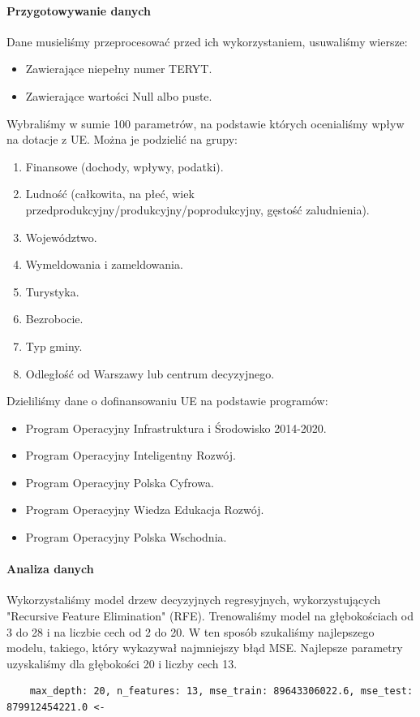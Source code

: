 \documentclass[12pt]{article}
\begin{document}
\paragraph{Przygotowywanie danych}
Dane musieliśmy przeprocesować przed ich wykorzystaniem, usuwaliśmy wiersze:
\begin{itemize}
    \item Zawierające niepełny numer TERYT.
    \item Zawierające wartości Null albo puste.
\end{itemize}
Wybraliśmy w sumie 100 parametrów, na podstawie których ocenialiśmy wpływ na dotacje z UE. Można je podzielić na grupy:
\begin{enumerate}
    \item Finansowe (dochody, wpływy, podatki).
    \item Ludność (całkowita, na płeć, wiek przedprodukcyjny/produkcyjny/poprodukcyjny, gęstość zaludnienia).
    \item Województwo.
    \item Wymeldowania i zameldowania.
    \item Turystyka.
    \item Bezrobocie.
    \item Typ gminy.
    \item Odległość od Warszawy lub centrum decyzyjnego.
\end{enumerate}
Dzieliliśmy dane o dofinansowaniu UE na podstawie programów:
\begin{itemize}
    \item Program Operacyjny Infrastruktura i Środowisko 2014-2020.
    \item Program Operacyjny Inteligentny Rozwój.
    \item Program Operacyjny Polska Cyfrowa.
    \item Program Operacyjny Wiedza Edukacja Rozwój.
    \item Program Operacyjny Polska Wschodnia.
\end{itemize}

\paragraph{Analiza danych}
Wykorzystaliśmy model drzew decyzyjnych regresyjnych, wykorzystujących "Recursive Feature Elimination" (RFE). 
Trenowaliśmy model na głębokościach od 3 do 28 i na liczbie cech od 2 do 20. 
W ten sposób szukaliśmy najlepszego modelu, takiego, który wykazywał najmniejszy błąd MSE. 
Najlepsze parametry uzyskaliśmy dla głębokości 20 i liczby cech 13.
\begin{lstlisting}
    max_depth: 20, n_features: 13, mse_train: 89643306022.6, mse_test: 879912454221.0 <-
\end{lstlisting}
\end{document}
